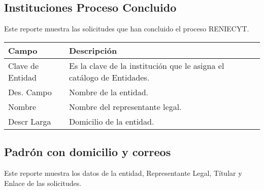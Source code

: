 \newpage
\subsection{Instituciones Proceso Concluido}
\label{appendix:Reportes:PeopleSoft:InstitucionesProcesoConcluido}

Este reporte muestra las solicitudes que han concluido el proceso RENIECYT.\\

\begin{tabular}{ m{} m{}  }%
	\rowcolor{gray1} {\bf Campo} &  {\bf Descripción} \\ \hline \hline

	Clave de Entidad & Es la clave de la institución que le asigna el catálogo de Entidades.\\
	\rowcolor{gray1}Des. Campo & Nombre de la entidad.\\
	Nombre & Nombre del representante legal.\\
	\rowcolor{gray1}Descr Larga & Domicilio de la entidad.\\
\end{tabular}

\subsection{Padrón con domicilio y correos}
\label{appendix:Reportes:PeopleSoft:PadronDomicilioyCorreos}

Este reporte muestra los datos de la entidad, Representante Legal, Títular y Enlace de las solicitudes.\\


